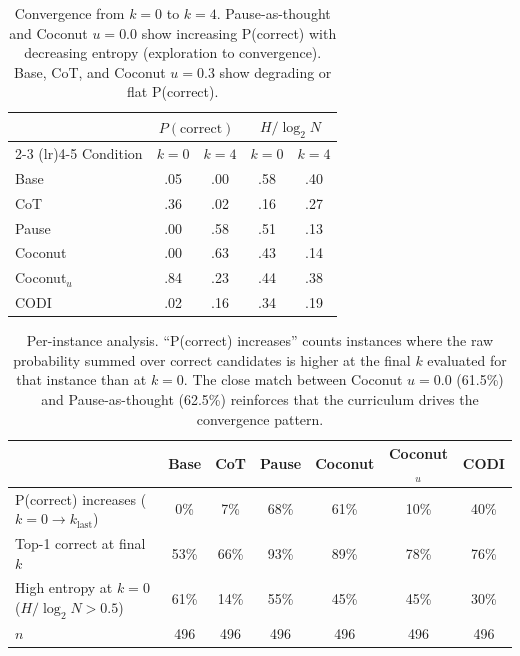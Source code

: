 \begin{table}[h!]
\centering
\small
\caption{Convergence from $k{=}0$ to $k{=}4$. Pause-as-thought and Coconut $u{=}0.0$ show increasing P(correct) with decreasing entropy (exploration to convergence). Base, CoT, and Coconut $u{=}0.3$ show degrading or flat P(correct).}
\begin{tabular}{l cc cc}
\toprule
& \multicolumn{2}{c}{$P(\text{correct})$} & \multicolumn{2}{c}{$H/\log_2 N$} \\
\cmidrule(lr){2-3} \cmidrule(lr){4-5}
Condition & $k{=}0$ & $k{=}4$ & $k{=}0$ & $k{=}4$ \\
\midrule
Base & .05 & .00 & .58 & .40 \\
CoT & .36 & .02 & .16 & .27 \\
Pause & .00 & .58 & .51 & .13 \\
Coconut & .00 & .63 & .43 & .14 \\
Coconut$_{u}$ & .84 & .23 & .44 & .38 \\
CODI & .02 & .16 & .34 & .19 \\
\bottomrule
\end{tabular}
\label{tab:convergence_trajectories}
\end{table}


\begin{table}[h!]
\centering
\small
\caption{Per-instance analysis. ``P(correct) increases'' counts instances where the raw probability summed over correct candidates is higher at the final $k$ evaluated for that instance than at $k{=}0$. The close match between Coconut $u{=}0.0$ (61.5\%) and Pause-as-thought (62.5\%) reinforces that the curriculum drives the convergence pattern.}
\begin{tabular}{l cccccc}
\toprule
 & Base & CoT & Pause & Coconut & Coconut$_{u}$ & CODI \\
\midrule
P(correct) increases ($k{=}0 \to k_{\text{last}}$) & 0\% & 7\% & 68\% & 61\% & 10\% & 40\% \\
Top-1 correct at final $k$ & 53\% & 66\% & 93\% & 89\% & 78\% & 76\% \\
High entropy at $k{=}0$ ($H/\log_2 N > 0.5$) & 61\% & 14\% & 55\% & 45\% & 45\% & 30\% \\
\midrule
$n$ & 496 & 496 & 496 & 496 & 496 & 496 \\
\bottomrule
\end{tabular}
\label{tab:per_instance_statistics}
\end{table}
